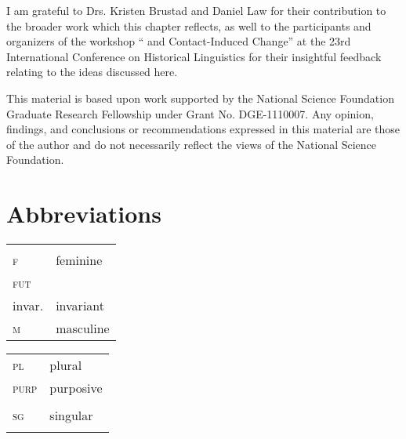 \documentclass[output=paper]{langsci/langscibook}
\begin{document}
I am grateful to Drs. Kristen Brustad and Daniel Law for their contribution to the broader work which this chapter reflects, as well to the participants and organizers of the workshop “ and Contact-Induced Change” at the 23rd International Conference on Historical Linguistics for their insightful feedback relating to the ideas discussed here.

This material is based upon work supported by the National Science Foundation Graduate Research Fellowship under Grant No. DGE-1110007. Any opinion, findings, and conclusions or recommendations expressed in this material are those of the author and do not necessarily reflect the views of the National Science Foundation.

\section*{Abbreviations}
\begin{tabularx}{.6\textwidth}{@{}lQ@{}}
 &  \\
\textsc{f} & feminine \\
\textsc{fut} &  \\
invar. & invariant \\
\textsc{m} & masculine \\
\end{tabularx}%
\begin{tabularx}{.5\textwidth}{@{}lQ@{}}
\textsc{pl} & plural \\
\textsc{purp} & purposive \\
 &  \\
\textsc{sg} & singular \\
 &  \\
\end{tabularx}%

\sloppy
\printbibliography[heading=subbibliography,notkeyword=this] 
\end{document}
